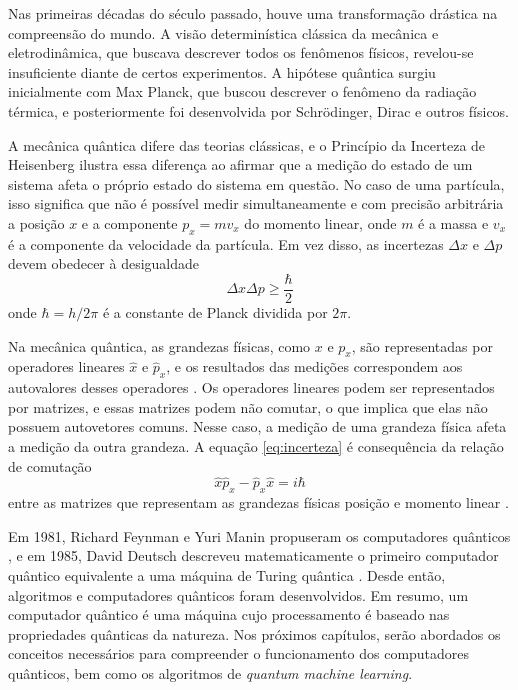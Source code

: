 Nas primeiras décadas do século passado, houve uma transformação drástica na compreensão do mundo. A visão determinística clássica da mecânica e eletrodinâmica, que buscava descrever todos os fenômenos físicos, revelou-se insuficiente diante de certos experimentos. A hipótese quântica surgiu inicialmente com Max Planck, que buscou descrever o fenômeno da radiação térmica, e posteriormente foi desenvolvida por Schrödinger, Dirac \cite{Dirac} e outros físicos.

A mecânica quântica difere das teorias clássicas, e o Princípio da Incerteza de Heisenberg \cite{Mermin2007QComputerScience} ilustra essa diferença ao afirmar que a medição do estado de um sistema afeta o próprio estado do sistema em questão. No caso de uma partícula, isso significa que não é possível medir simultaneamente e com precisão arbitrária a posição $x$ e a componente $p_x=mv_x$ do momento linear, onde $m$ é a massa e $v_x$ é a componente da velocidade da partícula. Em vez disso, as incertezas $\Delta x$ e $\Delta p$ devem obedecer à desigualdade
\begin{equation} \label{eq:incerteza}
\Delta x \Delta p \geq \frac{\hbar}{2}
\end{equation}
\noindent onde $\hbar=h/2\pi$ é a constante de Planck dividida por $2\pi$.

Na mecânica quântica, as grandezas físicas, como $x$ e $p_x$, são representadas por operadores lineares $\hat{x}$ e $\hat{p}_x$, e os resultados das medições correspondem aos autovalores desses operadores \cite{Zubairy2020}. Os operadores lineares podem ser representados por matrizes, e essas matrizes podem não comutar, o que implica que elas não possuem autovetores comuns. Nesse caso, a medição de uma grandeza física afeta a medição da outra grandeza. A equação \ref{eq:incerteza} é consequência da relação de comutação
\begin{equation} \label{eq:heisenberg}
\hat{x}\hat{p}_x - \hat{p}_x \hat{x} = i\hbar
\end{equation}
\noindent entre as matrizes que representam as grandezas físicas posição e momento linear \cite{Zubairy2020}.

Em 1981, Richard Feynman e Yuri Manin propuseram os computadores quânticos \cite{Wong2022IntroductionClassicalQuantum}, e em 1985, David Deutsch descreveu matematicamente o primeiro computador quântico equivalente a uma máquina de Turing quântica \cite{Mermin2007QComputerScience}. Desde então, algoritmos e computadores quânticos foram desenvolvidos. Em resumo, um computador quântico é uma máquina cujo processamento é baseado nas propriedades quânticas da natureza. Nos próximos capítulos, serão abordados os conceitos necessários para compreender o funcionamento dos computadores quânticos, bem como os algoritmos de \textit{quantum machine learning}.


